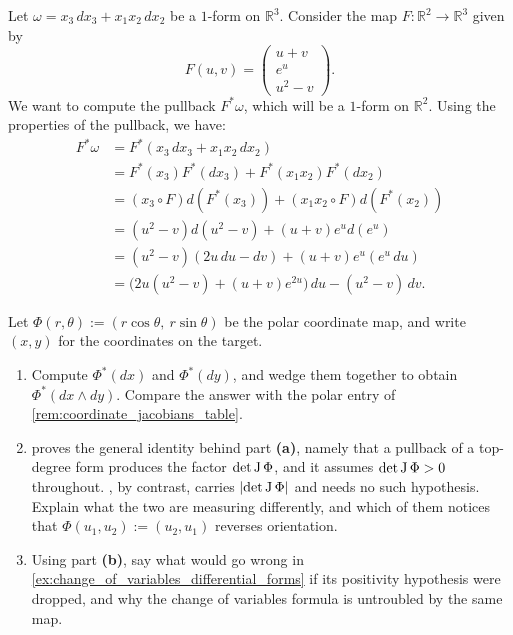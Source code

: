 \begin{example}
\label{ex:computing_pullback}
Let $\omega = x_3 \,dx_3 + x_1 x_2 \,dx_2$ be a $1$-form on $\mathbb{R}^3$.
Consider the map $F : \mathbb{R}^2 \to \mathbb{R}^3$ given by
\[F(u,v) = \begin{pmatrix} u+v \\ e^u \\ u^2 - v \end{pmatrix}.\]
We want to compute the pullback $F^*\omega$, which will be a $1$-form on $\mathbb{R}^2$.
Using the properties of the pullback, we have:
\begin{align*}
F^*\omega &= F^*(x_3 \,dx_3 + x_1 x_2 \,dx_2) \\
&= F^*(x_3) F^*(dx_3) + F^*(x_1 x_2) F^*(dx_2) \\
&= (x_3 \circ F) d(F^*(x_3)) + (x_1 x_2 \circ F) d(F^*(x_2)) \\
&= (u^2 - v) d(u^2 - v) + (u+v)e^u d(e^u) \\
&= (u^2 - v)(2u \,du - dv) + (u+v)e^u (e^u \,du) \\
&= \big(2u(u^2 - v) + (u+v)e^{2u}\big) \,du - (u^2 - v) \,dv.
\end{align*}
\end{example}

\begin{aiexercise}
\label{ex:ai_pullback_area_form}
Let $\Phi(r,\theta) := (r\cos\theta,\ r\sin\theta)$ be the polar coordinate map, and write
$(x,y)$ for the coordinates on the target.
\begin{enumerate}[label=\textbf{(\alph*)}]
  \item Compute $\Phi^*(dx)$ and $\Phi^*(dy)$, and wedge them together to obtain
    $\Phi^*(dx\wedge dy)$. Compare the answer with the polar entry of
    \cref{rem:coordinate_jacobians_table}.
  \item {} proves the general identity behind part \textbf{(a)}, namely that a
    pullback of a top-degree form produces the factor $\det\operatorname{J}\Phi$, and it assumes
    $\det\operatorname{J}\Phi > 0$ throughout. , by contrast, carries
    $\lvert\det\operatorname{J}\Phi\rvert$ and needs no such hypothesis. Explain what the two are measuring
    differently, and which of them notices that $\Phi(u_1,u_2) := (u_2,u_1)$ reverses
    orientation.
  \item Using part \textbf{(b)}, say what would go wrong in \cref{ex:change_of_variables_differential_forms} if its positivity
    hypothesis were dropped, and why the change of variables formula is untroubled by the same
    map.
\end{enumerate}
\end{aiexercise}
